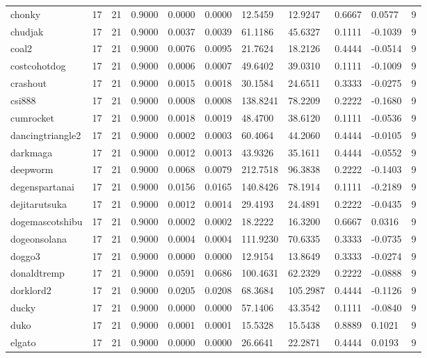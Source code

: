 \begin{table}[htbp]
\begin{tabular}{lllllllllll}
chonky & 17 & 21 & 0.9000 & 0.0000 & 0.0000 & 12.5459 & 12.9247 & 0.6667 & 0.0577 & 9 \\
chudjak & 17 & 21 & 0.9000 & 0.0037 & 0.0039 & 61.1186 & 45.6327 & 0.1111 & -0.1039 & 9 \\
coal2 & 17 & 21 & 0.9000 & 0.0076 & 0.0095 & 21.7624 & 18.2126 & 0.4444 & -0.0514 & 9 \\
costcohotdog & 17 & 21 & 0.9000 & 0.0006 & 0.0007 & 49.6402 & 39.0310 & 0.1111 & -0.1009 & 9 \\
crashout & 17 & 21 & 0.9000 & 0.0015 & 0.0018 & 30.1584 & 24.6511 & 0.3333 & -0.0275 & 9 \\
csi888 & 17 & 21 & 0.9000 & 0.0008 & 0.0008 & 138.8241 & 78.2209 & 0.2222 & -0.1680 & 9 \\
cumrocket & 17 & 21 & 0.9000 & 0.0018 & 0.0019 & 48.4700 & 38.6120 & 0.1111 & -0.0536 & 9 \\
dancingtriangle2 & 17 & 21 & 0.9000 & 0.0002 & 0.0003 & 60.4064 & 44.2060 & 0.4444 & -0.0105 & 9 \\
darkmaga & 17 & 21 & 0.9000 & 0.0012 & 0.0013 & 43.9326 & 35.1611 & 0.4444 & -0.0552 & 9 \\
deepworm & 17 & 21 & 0.9000 & 0.0068 & 0.0079 & 212.7518 & 96.3838 & 0.2222 & -0.1403 & 9 \\
degenspartanai & 17 & 21 & 0.9000 & 0.0156 & 0.0165 & 140.8426 & 78.1914 & 0.1111 & -0.2189 & 9 \\
dejitarutsuka & 17 & 21 & 0.9000 & 0.0012 & 0.0014 & 29.4193 & 24.4891 & 0.2222 & -0.0435 & 9 \\
dogemascotshibu & 17 & 21 & 0.9000 & 0.0002 & 0.0002 & 18.2222 & 16.3200 & 0.6667 & 0.0316 & 9 \\
dogeonsolana & 17 & 21 & 0.9000 & 0.0004 & 0.0004 & 111.9230 & 70.6335 & 0.3333 & -0.0735 & 9 \\
doggo3 & 17 & 21 & 0.9000 & 0.0000 & 0.0000 & 12.9154 & 13.8649 & 0.3333 & -0.0274 & 9 \\
donaldtremp & 17 & 21 & 0.9000 & 0.0591 & 0.0686 & 100.4631 & 62.2329 & 0.2222 & -0.0888 & 9 \\
dorklord2 & 17 & 21 & 0.9000 & 0.0205 & 0.0208 & 68.3684 & 105.2987 & 0.4444 & -0.1126 & 9 \\
ducky & 17 & 21 & 0.9000 & 0.0000 & 0.0000 & 57.1406 & 43.3542 & 0.1111 & -0.0840 & 9 \\
duko & 17 & 21 & 0.9000 & 0.0001 & 0.0001 & 15.5328 & 15.5438 & 0.8889 & 0.1021 & 9 \\
elgato & 17 & 21 & 0.9000 & 0.0000 & 0.0000 & 26.6641 & 22.2871 & 0.4444 & 0.0193 & 9 \\

\end{tabular}
\end{table}
